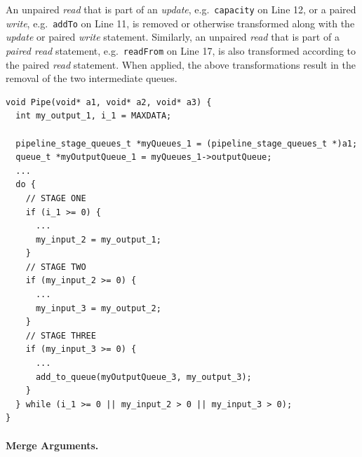 %
An unpaired \emph{read} that is part of an \emph{update}, e.g.\ \lstinline|capacity| on Line 12, or a paired \emph{write}, e.g.\ \lstinline|addTo| on Line 11, is removed or otherwise transformed along with the \emph{update} or paired \emph{write} statement. Similarly, an unpaired \emph{read} that is part of a \emph{paired read} statement, e.g.\ \lstinline|readFrom| on Line 17, is also transformed according to the paired \emph{read} statement.
%
%
When applied, the above transformations result in the removal of the two intermediate queues.
%
\begin{lstlisting}[frame=single]
void Pipe(void* a1, void* a2, void* a3) {
  int my_output_1, i_1 = MAXDATA;
  
  pipeline_stage_queues_t *myQueues_1 = (pipeline_stage_queues_t *)a1;
  queue_t *myOutputQueue_1 = myQueues_1->outputQueue;
  ...
  do {
    // STAGE ONE
    if (i_1 >= 0) { 
      ...
      my_input_2 = my_output_1;
    }
    // STAGE TWO
    if (my_input_2 >= 0) {
      ...
      my_input_3 = my_output_2;
    }    
    // STAGE THREE
    if (my_input_3 >= 0) {
      ...
      add_to_queue(myOutputQueue_3, my_output_3);
    }
  } while (i_1 >= 0 || my_input_2 > 0 || my_input_3 > 0);
}
\end{lstlisting}



\paragraph{Merge Arguments.}


